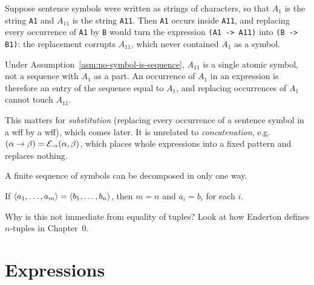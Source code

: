 \documentclass[11pt]{article}
\begin{document}
\begin{example}
\label{ex:atomic-symbols}
Suppose sentence symbols were written as strings of characters, so that
$A_1$ is the string \texttt{A1} and $A_{11}$ is the string \texttt{A11}.
Then \texttt{A1} occurs inside \texttt{A11}, and replacing every occurrence of
\texttt{A1} by \texttt{B} would turn the expression \texttt{(A1 -> A11)} into
\texttt{(B -> B1)}: the replacement corrupts $A_{11}$, which never contained
$A_1$ as a symbol.

Under Assumption~\ref{asm:no-symbol-is-sequence}, $A_{11}$ is a single atomic
symbol, not a sequence with $A_1$ as a part. An occurrence of $A_1$ in an
expression is therefore an entry of the sequence equal to $A_1$, and
replacing occurrences of $A_1$ cannot touch $A_{11}$.
\end{example}

\begin{remark}
This matters for \emph{substitution} (replacing every occurrence of a
sentence symbol in a wff by a wff), which comes later. It is unrelated to
\emph{concatenation}, e.g.\ $(\alpha\to\beta)=\mathcal{E}_{\to}(\alpha,\beta)$, which
places whole expressions into a fixed pattern and replaces nothing.
\end{remark}

\begin{proposition}\label{prop:unique-decomposition}
A finite sequence of symbols can be decomposed in only one way.
\end{proposition}

\begin{quantified}
If $\langle a_1,\dots,a_m\rangle = \langle b_1,\dots,b_n\rangle$, then $m=n$ and $a_i=b_i$ for each $i$.
\end{quantified}

\begin{question}
Why is this not immediate from equality of tuples? Look at how Enderton
defines $n$-tuples in Chapter~0.
\end{question}

\section{Expressions}
\end{document}
